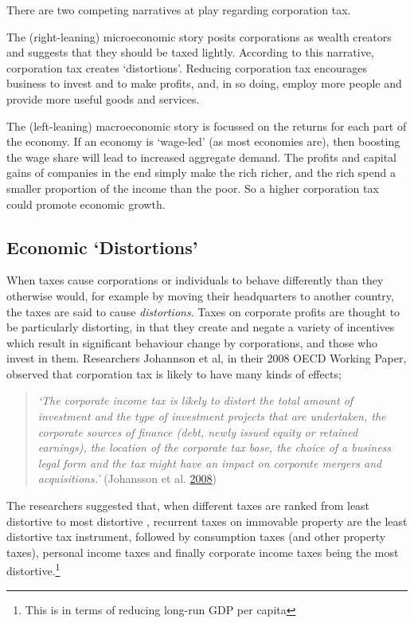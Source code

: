 \documentclass[]{tufte-handout}
\begin{document}
There are two competing narratives at play regarding corporation tax.

The (right-leaning) microeconomic story posits corporations as wealth
creators and suggests that they should be taxed lightly. According to
this narrative, corporation tax creates `distortions'. Reducing
corporation tax encourages business to invest and to make profits, and,
in so doing, employ more people and provide more useful goods and
services.

The (left-leaning) macroeconomic story is focussed on the returns for
each part of the economy. If an economy is `wage-led' (as most economies
are), then boosting the wage share will lead to increased aggregate
demand. The profits and capital gains of companies in the end simply
make the rich richer, and the rich spend a smaller proportion of the
income than the poor. So a higher corporation tax could promote economic
growth.

\hypertarget{economic-distortions}{%
\subsection{Economic `Distortions'}\label{economic-distortions}}

When taxes cause corporations or individuals to behave differently than
they otherwise would, for example by moving their headquarters to
another country, the taxes are said to cause \emph{distortions}. Taxes
on corporate profits are thought to be particularly distorting, in that
they create and negate a variety of incentives which result in
significant behaviour change by corporations, and those who invest in
them. Researchers Johannson et al, in their 2008 OECD Working Paper,
observed that corporation tax is likely to have many kinds of effects;

\begin{quote}
\emph{`The corporate income tax is likely to distort the total amount of
investment and the type of investment projects that are undertaken, the
corporate sources of finance (debt, newly issued equity or retained
earnings), the location of the corporate tax base, the choice of a
business legal form and the tax might have an impact on corporate
mergers and acquisitions.'} (Johansson et al.
\protect\hyperlink{ref-Johansson2008}{2008})
\end{quote}

The researchers suggested that, when different taxes are ranked from
least distortive to most distortive , recurrent taxes on immovable
property are the least distortive tax instrument, followed by
consumption taxes (and other property taxes), personal income taxes and
finally corporate income taxes being the most distortive.\footnote{This
  is in terms of reducing long-run GDP per capita}
\end{document}
